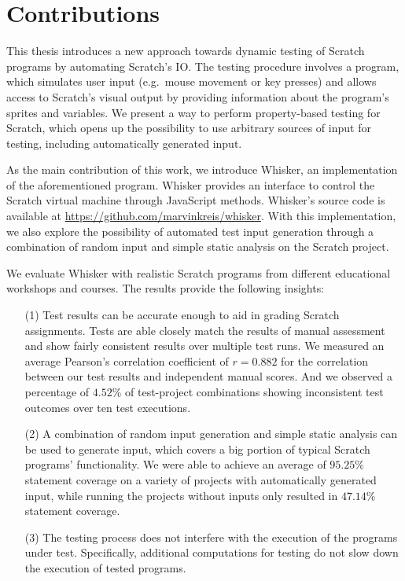 \section{Contributions}

This thesis introduces a new approach towards dynamic testing of Scratch programs by automating Scratch's IO.
The testing procedure involves a program, which simulates user input (e.g.\ mouse movement or key presses)
and allows access to Scratch's visual output by providing information about the program's sprites and variables.
We present a way to perform property-based testing \cite{quickcheck} for Scratch,
which opens up the possibility to use arbitrary sources of input for testing,
including automatically generated input.
\parspace

As the main contribution of this work, we introduce Whisker, an implementation of the aforementioned program.
Whisker provides an interface to control the Scratch virtual machine through JavaScript methods.
Whisker's source code is available at \url{https://github.com/marvinkreis/whisker}.
With this implementation, we also explore the possibility of automated test input generation through a combination of random input and simple static analysis on the Scratch project.
\parspace

We evaluate Whisker with realistic Scratch programs from different educational workshops and courses.
The results provide the following insights:

\begin{enumerate}
    \item[(1)] Test results can be accurate enough to aid in grading Scratch assignments.
        Tests are able closely match the results of manual assessment and show fairly consistent results over multiple test runs.
        We measured an average Pearson's correlation coefficient of $r = 0.882$ for the correlation
        between our test results and independent manual scores.
        And we observed a percentage of $4.52\%$ of test-project combinations showing inconsistent test outcomes over ten test executions.
    \item[(2)] A combination of random input generation and simple static analysis can be used to generate input, which covers a big portion of
        typical Scratch programs' functionality.
        We were able to achieve an average of $95.25\%$ statement coverage on a variety of projects with automatically generated input,
        while running the projects without inputs only resulted in $47.14\%$ statement coverage.
    \item[(3)] The testing process does not interfere with the execution of the programs under test.
        Specifically, additional computations for testing do not slow down the execution of tested programs.
\end{enumerate}

